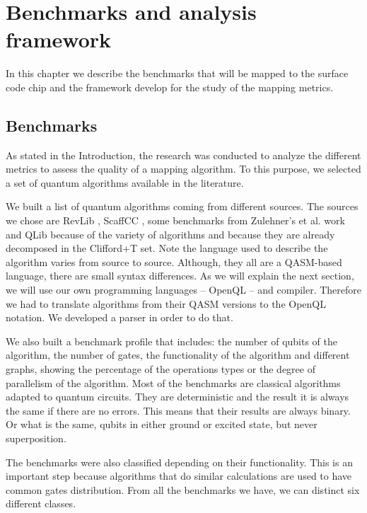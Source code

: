 
\chapter*{Benchmarks and analysis framework}
\label{sec:org848d3ef}

In this chapter we describe the benchmarks that will be mapped to the surface code chip and the framework develop for the study of the mapping metrics.

\section*{Benchmarks}
\label{sec:org87f661a}
As stated in the Introduction, the research was conducted to analyze the different metrics to assess the quality of a mapping algorithm.
To this purpose, we selected a set of quantum algorithms available in the literature.

We built a list of quantum algorithms coming from different sources.
The sources we chose are RevLib \cite{Wille_2008}, ScaffCC \cite{JavadiAbhari_2015}, some benchmarks from Zulehner's et al. work \cite{zulehner17:effic_method_mappin_quant_circuit} and QLib \cite{Lin_2014} because of the variety of algorithms and because they are already decomposed in the Clifford+T set.
Note the language used to describe the algorithm varies from source to source.
Although, they all are a QASM-based language, there are small syntax differences.
As we will explain the next section, we will use our own programming languages -- OpenQL -- and compiler.
Therefore we had to translate algorithms from their QASM versions to the OpenQL notation.
We developed a parser in order to do that.

We also built a benchmark profile that includes: the number of qubits of the algorithm, the number of gates, the functionality of the algorithm and different graphs, showing the percentage of the operations types or the degree of parallelism of the algorithm.
Most of the benchmarks are classical algorithms adapted to quantum circuits.
They are deterministic and the result it is always the same if there are no errors.
This means that their results are always binary.
Or what is the same, qubits in either ground or excited state, but never superposition.


The benchmarks were also classified depending on their functionality.
This is an important step because algorithms that do similar calculations are used to have common gates distribution.
From all the benchmarks we have, we can distinct six different classes.

